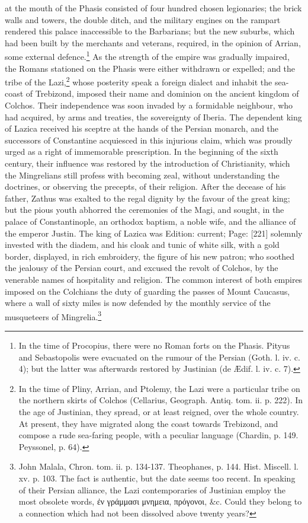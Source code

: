 at the mouth of the Phasis consisted of four hundred chosen legionaries; the brick walls and towers, the double ditch, and the military engines on the rampart rendered this palace inaccessible to the Barbarians; but the new suburbs, which had been built by the merchants and veterans, required, in the opinion of Arrian, some external defence.\footnote{In the time of Procopius, there were no Roman forts on the Phasis. Pityus and Sebastopolis were evacuated on the rumour of the Persian (Goth. l. iv. c. 4); but the latter was afterwards restored by Justinian (de Ædif. l. iv. c. 7).} As the strength of the empire was gradually impaired, the Romans stationed on the Phasis were either withdrawn or expelled; and the tribe of the Lazi,\footnote{In the time of Pliny, Arrian, and Ptolemy, the Lazi were a particular tribe on the northern skirts of Colchos (Cellarius, Geograph. Antiq. tom. ii. p. 222). In the age of Justinian, they spread, or at least reigned, over the whole country. At present, they have migrated along the coast towards Trebizond, and compose a rude sea-faring people, with a peculiar language (Chardin, p. 149. Peyssonel, p. 64).} whose posterity speak a foreign dialect and inhabit the sea-coast of Trebizond, imposed their name and dominion on the ancient kingdom of Colchos. Their independence was soon invaded by a formidable neighbour, who had acquired, by arms and treaties, the sovereignty of Iberia. The dependent king of Lazica received his sceptre at the hands of the Persian monarch, and the successors of Constantine acquiesced in this injurious claim, which was proudly urged as a right of immemorable prescription. In the beginning of the sixth century, their influence was restored by the introduction of Christianity, which the Mingrelians still profess with becoming zeal, without understanding the doctrines, or observing the precepts, of their religion. After the decease of his father, Zathus was exalted to the regal dignity by the favour of the great king; but the pious youth abhorred the ceremonies of the Magi, and sought, in the palace of Constantinople, an orthodox baptism, a noble wife, and the alliance of the emperor Justin. The king of Lazica was Edition: current; Page: [221] solemnly invested with the diadem, and his cloak and tunic of white silk, with a gold border, displayed, in rich embroidery, the figure of his new patron; who soothed the jealousy of the Persian court, and excused the revolt of Colchos, by the venerable names of hospitality and religion. The common interest of both empires imposed on the Colchians the duty of guarding the passes of Mount Caucasus, where a wall of sixty miles is now defended by the monthly service of the musqueteers of Mingrelia.\footnote{John Malala, Chron. tom. ii. p. 134-137. Theophanes, p. 144. Hist. Miscell. l. xv. p. 103. The fact is authentic, but the date seems too recent. In speaking of their Persian alliance, the Lazi contemporaries of Justinian employ the most obsolete words, \textgreek{\texthebrew{ἐ}ν γράμμασι μνημεια, πρόγονοι}, \&c. Could they belong to a connection which had not been dissolved above twenty years?}

